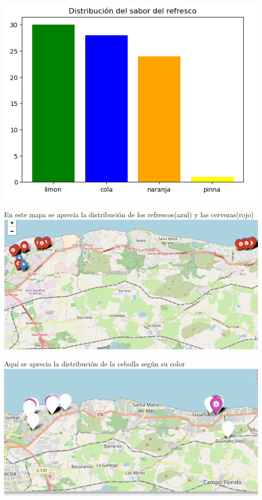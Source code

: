 \documentclass{beamer}
\begin{document}
\begin{frame}
    \includegraphics[scale=0.5]{sabor de refresco.png}
    \end{frame}

\begin{frame}
    En este mapa se aprecia la distribución de los refrescos(azul) y las cervezas(rojo)
    \includegraphics[scale=0.30]{mapa de cerveza y refresco.png}
    \end{frame}

\begin{frame}
    Aquí se aprecia la distribución de la cebolla según su color
    \includegraphics[scale=0.5]{mapa de cebolla.png}
    \end{frame}    
    
\end{document}
